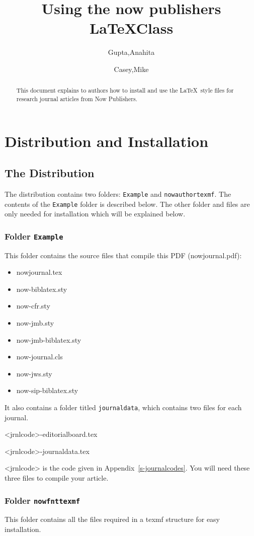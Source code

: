 \documentclass[example,biber]{now-journal} %
\title{Using the now publishers \LaTeX Class}
\author[1*]{Gupta,Anahita}
\author[1]{Casey,Mike}
\affil[1]{now publishers, Inc.}
\begin{document}
\begin{abstract}
This document explains to authors how to install and use the \LaTeX\ style files for research journal articles from Now Publishers.
\end{abstract}

\section{Distribution and Installation}
\label{s-distribution}

\subsection{The Distribution}
The distribution contains two folders: \texttt{Example}  and \texttt{nowauthortexmf}. The contents of the \texttt{Example} folder is described below. The other folder and files are only needed for installation which will be explained below.

\subsubsection{Folder \texttt{Example}}
This folder contains the source files that compile this PDF (nowjournal.pdf):

\begin{itemize}[noitemsep]
\item nowjournal.tex
\item now-biblatex.sty
\item now-cfr.sty
\item now-jmb.sty
\item now-jmb-biblatex.sty
\item now-journal.cls
\item now-jws.sty
\item now-sip-biblatex.sty
\end{itemize}

\noindent It also contains a folder titled \texttt{journaldata}, which contains two files for each journal.

<jrnlcode>-editorialboard.tex

<jrnlcode>-journaldata.tex

\noindent <jrnlcode> is the code given in Appendix~\ref{s-journalcodes}. You will need these three files to compile your article.

\subsubsection{Folder \texttt{nowfnttexmf}}
This folder contains all the files required in a texmf structure for easy installation.
\end{document}
